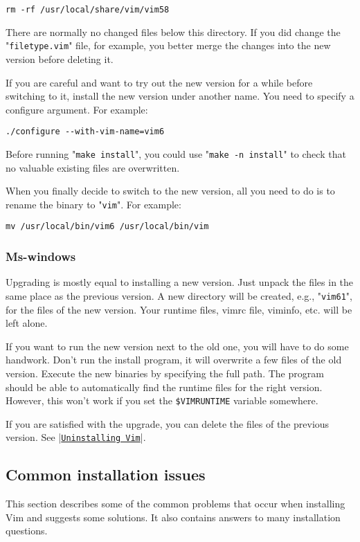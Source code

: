 \begin{Verbatim}[samepage=true]
 rm -rf /usr/local/share/vim/vim58
\end{Verbatim}

There are normally no changed files below this directory.
If you did change the "\texttt{filetype.vim}" file, for example, you better merge the changes into the new version before deleting it.

If you are careful and want to try out the new version for a while before switching to it, install the new version under another name.
You need to specify a configure argument.
For example:

\begin{Verbatim}[samepage=true]
 ./configure --with-vim-name=vim6
\end{Verbatim}

Before running "\texttt{make install}", you could use "\texttt{make -n install}" to check that no valuable existing files are overwritten.

When you finally decide to switch to the new version, all you need to do is to rename the binary to "\texttt{vim}".
For example:

\begin{Verbatim}[samepage=true]
 mv /usr/local/bin/vim6 /usr/local/bin/vim
\end{Verbatim}

\subsubsection{Ms-windows}
Upgrading is mostly equal to installing a new version.
Just unpack the files in the same place as the previous version.
A new directory will be created, e.g., "\texttt{vim61}", for the files of the new version.
Your runtime files, vimrc file, viminfo, etc. will be left alone.

If you want to run the new version next to the old one, you will have to do some handwork.
Don't run the install program, it will overwrite a few files of the old version.
Execute the new binaries by specifying the full path.
The program should be able to automatically find the runtime files for the right version.
However, this won't work if you set the \texttt{\$VIMRUNTIME} variable somewhere.

If you are satisfied with the upgrade, you can delete the files of the previous version.
See |\hyperref[Uninstalling Vim]{\texttt{Uninstalling Vim}}|.
\subsection{Common installation issues}
This section describes some of the common problems that occur when installing Vim and suggests some solutions.
It also contains answers to many installation questions.


